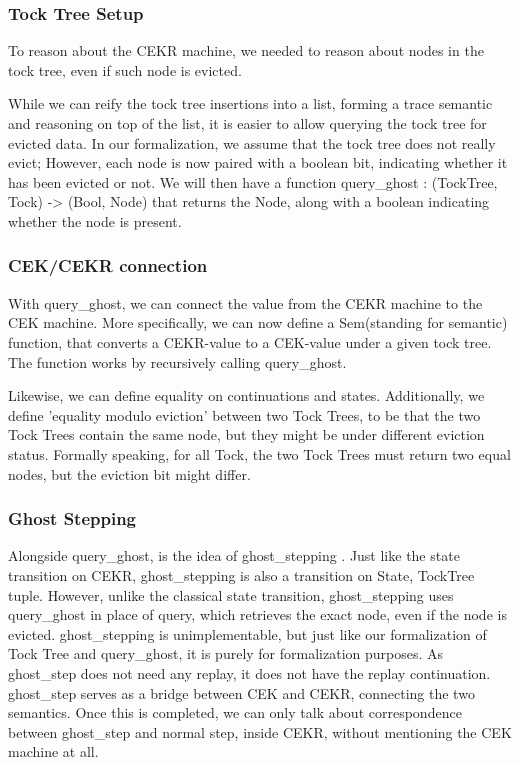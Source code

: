 \subsubsection{Tock Tree Setup}
To reason about the CEKR machine, we needed to reason about nodes in the tock tree, even if such node is evicted.

While we can reify the tock tree insertions into a list, forming a trace semantic and reasoning on top of the list, it is easier to allow querying the tock tree for evicted data. In our formalization, we assume that the tock tree does not really evict; However, each node is now paired with a boolean bit, indicating whether it has been evicted or not. We will then have a function query\_ghost : (TockTree, Tock) -> (Bool, Node) that returns the Node, along with a boolean indicating whether the node is present.

\subsubsection{CEK/CEKR connection}
With query\_ghost, we can connect the value from the CEKR machine to the CEK machine. More specifically, we can now define a Sem(standing for semantic) function, that converts a CEKR-value to a CEK-value under a given tock tree. The function works by recursively calling query\_ghost.


Likewise, we can define equality on continuations and states. Additionally, we define 'equality modulo eviction' between two Tock Trees, to be that the two Tock Trees contain the same node, but they might be under different eviction status. Formally speaking, for all Tock, the two Tock Trees must return two equal nodes, but the eviction bit might differ.

\subsubsection{Ghost Stepping}

Alongside query\_ghost, is the idea of ghost\_stepping . Just like the state transition on CEKR, ghost\_stepping is also a transition on State, TockTree tuple. However, unlike the classical state transition, ghost\_stepping uses query\_ghost in place of query, which retrieves the exact node, even if the node is evicted. ghost\_stepping is unimplementable, but just like our formalization of Tock Tree and query\_ghost, it is purely for formalization purposes. As ghost\_step does not need any replay, it does not have the replay continuation. ghost\_step serves as a bridge between CEK and CEKR, connecting the two semantics. Once this is completed, we can only talk about correspondence between ghost\_step and normal step, inside CEKR, without mentioning the CEK machine at all.

